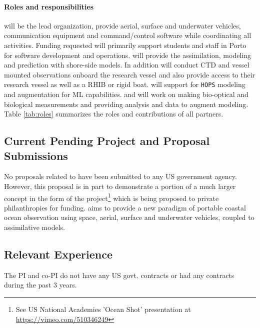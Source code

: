 \paragraph{Roles and responsibilities} \univ will be the lead
organization, provide aerial, surface and underwater vehicles,
communication equipment and command/control software while
coordinating all activities. Funding requested will primarily support
students and staff in Porto for software development and operations.
\inst will provide the assimilation, modeling and prediction with
shore-side models. In addition \inst will conduct CTD and vessel
mounted observations onboard the research vessel and also provide
access to their research vessel as well as a RHIB or rigid boat. \mit
will support \inst for \texttt{HOPS} modeling and augmentation for ML
capabilities. \colo and \ave will work on making bio-optical and
biological measurements and providing analysis and data to augment
\inst modeling. Table \ref{tab:roles} summarizes the roles and
contributions of all partners.


\subsection{Current Pending Project and Proposal Submissions}

No proposals related to \proj have been submitted to any US government
agency. However, this proposal is in part to demonstrate a portion of
a much larger concept in the form of the \met project\footnote{See US
  National Academies 'Ocean Shot' presentation at
  \url{https://vimeo.com/510346249}} which is being proposed to
private philanthropies for funding. \met aims to provide a new
paradigm of portable coastal ocean observation using space, aerial,
surface and underwater vehicles, coupled to assimilative models.

\subsection{Relevant Experience}


The PI and co-PI do not have any US govt. contracts or had any
contracts during the past 3 years. 